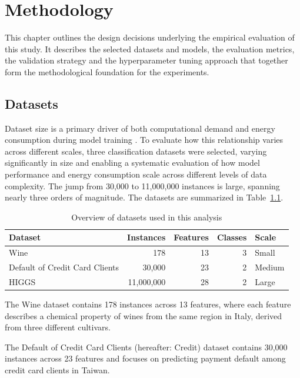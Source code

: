 \chapter{Methodology}
\label{experimental_design}
This chapter outlines the design decisions underlying the empirical evaluation of this study. It describes the selected datasets and models, the evaluation metrics, the validation strategy and the hyperparameter tuning approach that together form the methodological foundation for the experiments.

\section{Datasets}
\label{experimental_dataset}
Dataset size is a primary driver of both computational demand and energy consumption during model training \cite{rodriguezEvaluatingEnergyConsumption2024}. To evaluate how this relationship varies across different scales, three classification datasets were selected, varying significantly in size and enabling a systematic evaluation of how model performance and energy consumption scale across different levels of data complexity. The jump from 30,000 to 11,000,000 instances is large, spanning nearly three orders of magnitude. The datasets are summarized in Table~\ref{tab:datasets}.

\begin{table}[htbp]
\centering
\caption{Overview of datasets used in this analysis}
\label{tab:datasets}
\begin{tabular}{lrrrl}
\toprule
\textbf{Dataset} & \textbf{Instances} & \textbf{Features} & \textbf{Classes} & \textbf{Scale} \\
\midrule
Wine \cite{stefanaeberhardWine1992} & 178 & 13 & 3 & Small \\
Default of Credit Card Clients \cite{i-chengyehDefaultCreditCard2009} & 30,000 & 23 & 2 & Medium \\
HIGGS \cite{whitesonHIGGS2014} & 11,000,000 & 28 & 2 & Large \\
\bottomrule
\end{tabular}
\end{table}

The Wine \parencite{stefanaeberhardWine1992} dataset contains 178 instances across 13 features, where each feature describes a chemical property of wines from the same region in Italy, derived from three different cultivars.

The Default of Credit Card Clients \parencite{i-chengyehDefaultCreditCard2009} (hereafter: Credit) dataset contains 30,000 instances across 23 features and focuses on predicting payment default among credit card clients in Taiwan.


